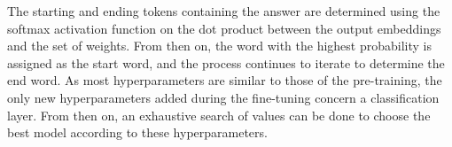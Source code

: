 The starting and ending tokens containing the answer are determined using the
softmax activation function on the dot product between the output embeddings and
the set of weights. From then on, the word with the highest probability is
assigned as the start word, and the process continues to iterate to determine
the end word. As most hyperparameters are similar to those of the pre-training,
the only new hyperparameters added during the fine-tuning concern a
classification layer. From then on, an exhaustive search of values can be done
to choose the best model according to these hyperparameters.

